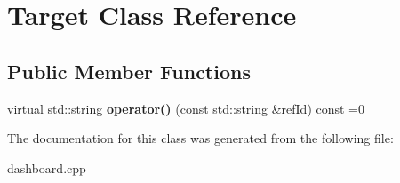 \section{Target Class Reference}
\label{classTarget}
\subsection*{Public Member Functions}
\begin{DoxyCompactItemize}
\item 
\mbox{\label{classTarget_ac5b28143edfd1c0ba5a920b556330799}} 
virtual std\+::string {\bfseries operator()} (const std\+::string \&ref\+Id) const =0
\end{DoxyCompactItemize}


The documentation for this class was generated from the following file\+:\begin{DoxyCompactItemize}
\item 
dashboard.\+cpp\end{DoxyCompactItemize}
